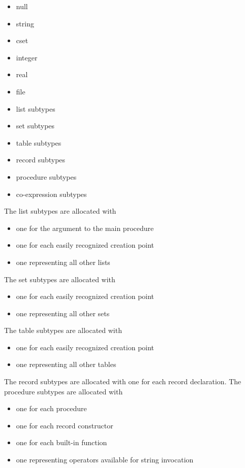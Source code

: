\liststyleLxxiii
\begin{itemize}
\item 
null 
\item 
string 
\item 
cset 
\item 
integer 
\item 
real 
\item 
file 
\item 
list subtypes 
\item 
set subtypes 
\item 
table subtypes 
\item 
record subtypes 
\item 
procedure subtypes 
\item 
co-expression subtypes 
\end{itemize}

The list subtypes are allocated with 

\liststyleLxxiv
\begin{itemize}
\item 
one for the argument to the main procedure 
\item 
one for each easily recognized creation point 
\item 
one representing all other lists 
\end{itemize}

The set subtypes are allocated with 

\liststyleLxxv
\begin{itemize}
\item 
one for each easily recognized creation point 
\item 
one representing all other sets 
\end{itemize}

The table subtypes are allocated with 

\liststyleLxxvi
\begin{itemize}
\item 
one for each easily recognized creation point 
\item 
one representing all other tables 
\end{itemize}

The record subtypes are allocated with one for each record
declaration. The procedure subtypes are allocated with

\liststyleLxxvii
\begin{itemize}
\item 
one for each procedure 
\item 
one for each record constructor 
\item 
one for each built-in function 
\item 
one representing operators available for string invocation 
\end{itemize}

